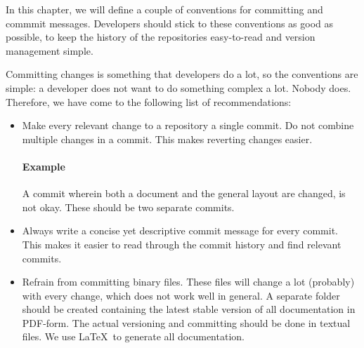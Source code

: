 In this chapter, we will define a couple of conventions for committing and commmit messages. Developers should stick to these conventions as good as possible, to keep the history of the repositories easy-to-read and version management simple.

Committing changes is something that developers do a lot, so the conventions are simple: a developer does not want to do something complex a lot. Nobody does. Therefore, we have come to the following list of recommendations:

\begin{itemize}
	\item Make every relevant change to a repository a single commit. Do not combine multiple changes in a commit. This makes reverting changes easier.
	\paragraph{Example} A commit wherein both a document and the general layout are changed, is not okay. These should be two separate commits.
	
	\item Always write a concise yet descriptive commit message for every commit. This makes it easier to read through the commit history and find relevant commits.
	
	\item Refrain from committing binary files. These files will change a lot (probably) with every change, which does not work well in general. A separate folder should be created containing the latest stable version of all documentation in PDF-form. The actual versioning and committing should be done in textual files. We use \LaTeX\ to generate all \projectname documentation.
\end{itemize}